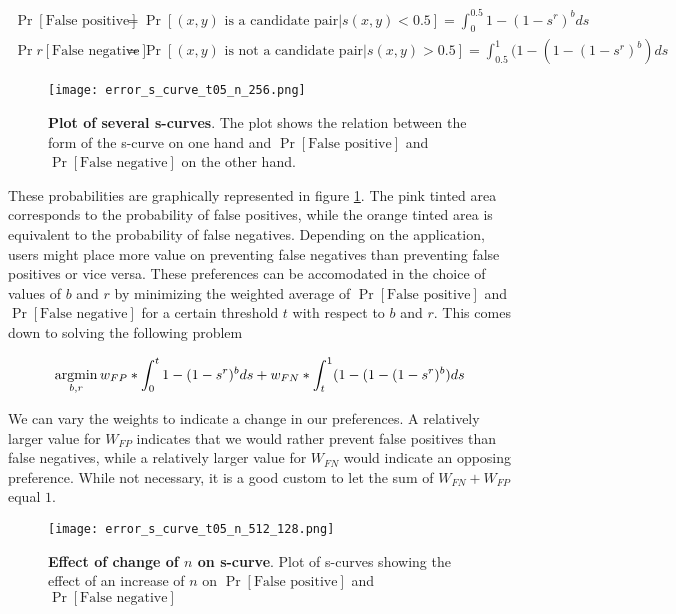 \begin{equation}
    \begin{split}    
        \operatorname{Pr}[\text{False positive}] &= \operatorname{Pr}[(x, y)\text{ is a candidate pair}| s(x, y) < 0.5 ] = \int_{0}^{0.5}1 - (1-s^r)^bds \\
        \operatorname{Pr}r[\text{False negative}] &= \operatorname{Pr}[(x, y)\text{ is not a candidate pair}| s(x, y) > 0.5 ] = \int_{0.5}^{1}(1-(1 - (1-s^r)^b)ds
    \end{split}
\end{equation}

\begin{figure}
    \centering
    \texttt{[image: error\_s\_curve\_t05\_n\_256.png]}
    \caption[Plot of several s-curves]{\textbf{Plot of several s-curves}. The plot shows the relation between the form of the s-curve on one hand and $\operatorname{Pr}[\text{False positive}]$ and $\operatorname{Pr}[\text{False negative}]$ on the other hand. }
    \label{fig:s_curve_with_fn_fp}
\end{figure}

These probabilities are graphically represented in figure \ref{fig:s_curve_with_fn_fp}. The pink tinted area corresponds to the probability of false positives, while the orange tinted area is equivalent to the probability of false negatives. Depending on the application, users might place more value on preventing false negatives than preventing false positives or vice versa. These preferences can be accomodated in the choice of values of $b$ and $r$ by minimizing the weighted average of $\operatorname{Pr}[\text{False positive}]$ and $\operatorname{Pr}[\text{False negative}]$ for a certain threshold $t$ with respect to $b$ and $r$. This comes down to solving the following problem

\begin{equation}
    \operatorname*{argmin}_{b,r} w_{FP} * \int_{0}^{t}1 - (1-s^r)^bds + w_{FN} * \int_{t}^{1}(1-(1 - (1-s^r)^b)ds
    \label{eq:optimize_for_b_and_r}
\end{equation}

We can vary the weights to indicate a change in our preferences. A relatively larger value for $W_{FP}$ indicates that we would rather prevent false positives than false negatives, while a relatively larger value for $W_{FN}$ would indicate an opposing preference. While not necessary, it is a good custom to let the sum of $W_{FN} + W_{FP}$ equal $1$. 

\begin{figure}[!htb]
    \centering
    \texttt{[image: error\_s\_curve\_t05\_n\_512\_128.png]}
    \caption[Effect of change of $n$ on s-curve]{\textbf{Effect of change of $n$ on s-curve}. Plot of s-curves showing the effect of an increase of $n$ on $\operatorname{Pr}[\text{False positive}]$ and $\operatorname{Pr}[\text{False negative}]$  }
    \label{fig:change_in_s_curve_as_n_increases}
\end{figure}

